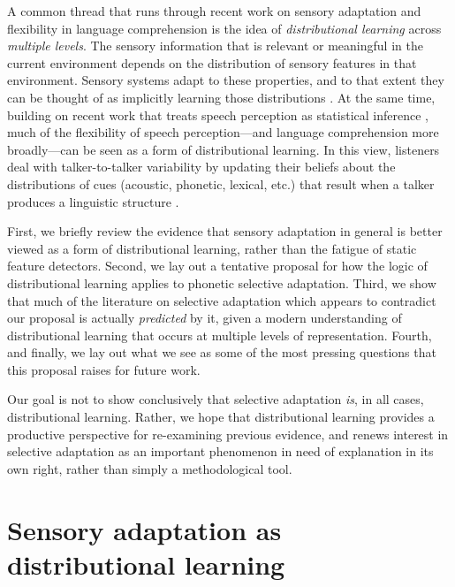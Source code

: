 A common thread that runs through recent work on sensory adaptation and flexibility in language comprehension is the idea of \emph{distributional learning} across \emph{multiple levels}.  The sensory information that is relevant or meaningful in the current environment depends on the distribution of sensory features in that environment. Sensory systems adapt to these properties, and to that extent they can be thought of as implicitly learning those distributions \cite{Brenner2000,Fairhall2001,Gutnisky2008,Sharpee2006,Stocker2006}.  At the same time, building on recent work that treats speech perception as statistical inference \cite[e.g.,][]{Clayards2008,Feldman2009a,Kleinschmidt2015,Norris2008,Sonderegger2010}, much of the flexibility of speech perception---and language comprehension more broadly---can be seen as a form of distributional learning.  In this view, listeners deal with talker-to-talker variability by updating their beliefs about the distributions of cues (acoustic, phonetic, lexical, etc.) that result when a talker produces a linguistic structure \autocite[phonetic category, word, syntactic structure, pragmatic intention, etc.; ][]{Fine2013c,Guediche2014,Holt2006c,Idemaru2011,Kleinschmidt2015,YildirimInPress}.

First, we briefly review the evidence that sensory adaptation in general is better viewed as a form of distributional learning, rather than the fatigue of static feature detectors.  Second, we lay out a tentative proposal for how the logic of distributional learning applies to phonetic selective adaptation.  Third, we show that much of the literature on selective adaptation which appears to contradict our proposal is actually \emph{predicted} by it, given a modern understanding of distributional learning that occurs at multiple levels of representation.  Fourth, and finally, we lay out what we see as some of the most pressing questions that this proposal raises for future work.

Our goal is not to show conclusively that selective adaptation \emph{is}, in all cases, distributional learning.  Rather, we hope that distributional learning provides a productive perspective for re-examining previous evidence, and renews interest in selective adaptation as an important phenomenon in need of explanation in its own right, rather than simply a methodological tool.
\label{r-phenomenon}

\section{Sensory adaptation as distributional learning}
\label{sec:sens-adapt-dist-learn}

